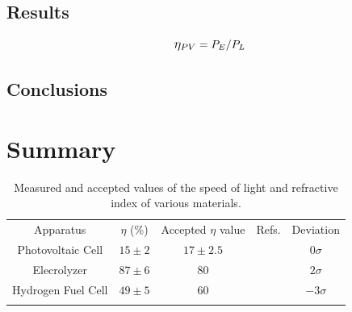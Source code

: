 \documentclass[aps,prl,reprint]{revtex4-2}
\begin{document}


\subsection{Results}

\newpage
\begin{equation}
    \mathlarger{\eta_{PV}}=P_E/P_L
    \label{eta_PV}
\end{equation}

\subsection{Conclusions}

\section{Summary}

\begin{widetext}
\begin{center}
\begin{table}[h]
\renewcommand{\arraystretch}{1.35}
\setlength{\tabcolsep}{10pt}
\caption{\label{}Measured and accepted values of the speed of light and refractive index of various materials.}
\begin{tabular}{|c|c|c|c|c|}
\toprule
Apparatus &  $\eta$ (\%) & Accepted $\eta$ value & Refs. & Deviation \\
\colrule
Photovoltaic Cell &  $15 \pm 2$ & $17 \pm 2.5$ & \cite{Solar Cell} & $0\sigma$  \\
\colrule
Elecrolyzer &  $87 \pm 6$ & 80 & \cite{Electrolyzer} & $2\sigma$  \\
\colrule
Hydrogen Fuel Cell &  $49 \pm 5$ & 60 & \cite{Fuel Cell} & $-3\sigma$  \\
\botrule
\end{tabular}
\end{table}
\end{center}
\end{widetext}
\end{document}
